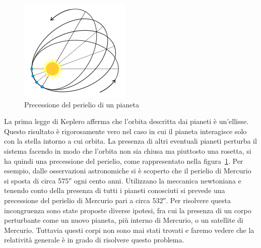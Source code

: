 \begin{figure}
  \centering
  \includegraphics{figure/precessione_perielio}
  \caption{Precessione del perielio di un pianeta}
  \label{fig:precessione-perielio}
\end{figure}
La prima legge di Keplero afferma che l'orbita descritta dai pianeti è
un'ellisse.  Questo risultato è rigorosamente vero nel caso in cui il pianeta
interagisce solo con la stella intorno a cui orbita.  La presenza di altri
eventuali pianeti perturba il sistema facendo in modo che l'orbita non sia
chiusa ma piuttosto una rosetta, si ha quindi una precessione del perielio, come
rappresentato nella figura~\ref{fig:precessione-perielio}.  Per esempio, dalle
osservazioni astronomiche si è scoperto che il perielio di Mercurio si sposta di
circa \ang{;;575} ogni cento anni.  Utilizzano la meccanica newtoniana e tenendo
conto della presenza di tutti i pianeti conosciuti si prevede una precessione
del perielio di Mercurio pari a circa \ang{;;532}.  Per risolvere questa
incongruenza sono state proposte diverse ipotesi, fra cui la presenza di un
corpo perturbante come un nuovo pianeta, più interno di Mercurio, o un satellite
di Mercurio.  Tuttavia questi corpi non sono mai stati trovati e faremo vedere
che la relatività generale è in grado di risolvere questo problema.

